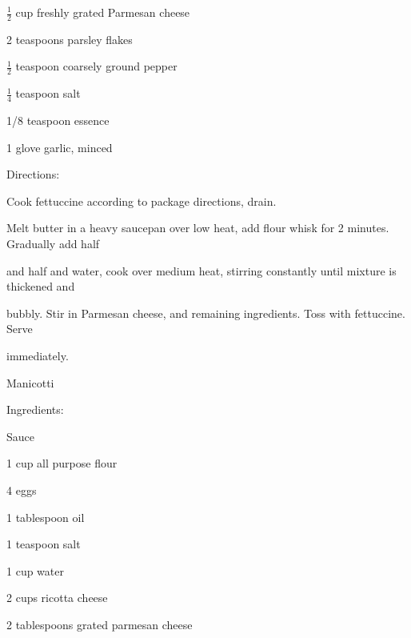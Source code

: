 \documentclass[a4paper,portrait,12pt]{book}
\begin{document}
$\frac{1}{2}$ cup freshly grated Parmesan cheese




2 teaspoons parsley flakes




$\frac{1}{2}$ teaspoon coarsely ground pepper




$\frac{1}{4}$ teaspoon salt




1/8 teaspoon essence




1 glove garlic, minced




Directions:




Cook fettuccine according to package directions, drain.




Melt butter in a heavy saucepan over low heat, add flour whisk for 2 minutes. Gradually add half




and half and water, cook over medium heat, stirring constantly until mixture is thickened and




bubbly. Stir in Parmesan cheese, and remaining ingredients. Toss with fettuccine. Serve




immediately.







\newpage
Manicotti




Ingredients:




Sauce




1 cup all purpose flour




4 eggs




1 tablespoon oil




1 teaspoon salt




1 cup water




2 cups ricotta cheese




2 tablespoons grated parmesan cheese
\end{document}
